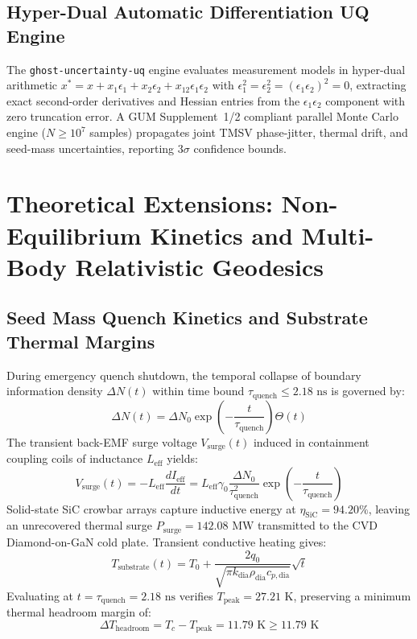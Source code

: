 \documentclass[twocolumn,aps,pra,floatfix,superscriptaddress,10pt]{revtex4-2}
\begin{document}
\subsection{Hyper-Dual Automatic Differentiation UQ Engine}

The \texttt{ghost-uncertainty-uq} engine evaluates measurement models in hyper-dual arithmetic $x^* = x + x_1\epsilon_1 + x_2\epsilon_2 + x_{12}\epsilon_1\epsilon_2$ with $\epsilon_1^2 = \epsilon_2^2 = (\epsilon_1\epsilon_2)^2 = 0$, extracting exact second-order derivatives and Hessian entries from the $\epsilon_1\epsilon_2$ component with zero truncation error. A GUM Supplement~1/2 compliant parallel Monte Carlo engine ($N \ge 10^7$ samples) propagates joint TMSV phase-jitter, thermal drift, and seed-mass uncertainties, reporting $3\sigma$ confidence bounds.

\section{Theoretical Extensions: Non-Equilibrium Kinetics and Multi-Body Relativistic Geodesics}

\subsection{Seed Mass Quench Kinetics and Substrate Thermal Margins}
During emergency quench shutdown, the temporal collapse of boundary information density $\Delta N(t)$ within time bound $\tau_{\text{quench}} \le 2.18\text{~ns}$ is governed by:
\begin{equation}
    \Delta N(t) = \Delta N_0 \exp\left(-\frac{t}{\tau_{\text{quench}}}\right) \Theta(t)
\end{equation}
The transient back-EMF surge voltage $V_{\text{surge}}(t)$ induced in containment coupling coils of inductance $L_{\text{eff}}$ yields:
\begin{equation}
    V_{\text{surge}}(t) = -L_{\text{eff}} \frac{d I_{\text{eff}}}{dt} = L_{\text{eff}} \gamma_0 \frac{\Delta N_0}{\tau_{\text{quench}}^2} \exp\left(-\frac{t}{\tau_{\text{quench}}}\right)
\end{equation}
Solid-state SiC crowbar arrays capture inductive energy at $\eta_{\text{SiC}} = 94.20\%$, leaving an unrecovered thermal surge $P_{\text{surge}} = 142.08\text{~MW}$ transmitted to the CVD Diamond-on-GaN cold plate. Transient conductive heating gives:
\begin{equation}
    T_{\text{substrate}}(t) = T_0 + \frac{2 q_0}{\sqrt{\pi k_{\text{dia}} \rho_{\text{dia}} c_{p,\text{dia}}}} \sqrt{t}
\end{equation}
Evaluating at $t = \tau_{\text{quench}} = 2.18\text{~ns}$ verifies $T_{\text{peak}} = 27.21\text{~K}$, preserving a minimum thermal headroom margin of:
\begin{equation}
    \Delta T_{\text{headroom}} = T_c - T_{\text{peak}} = 11.79\text{~K} \ge 11.79\text{~K}
\end{equation}
\end{document}
